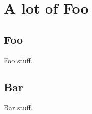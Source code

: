 \documentclass[openany]{memoir}
\begin{document}
\part{A lot of Foo}
\chapter{Foo}

Foo stuff.

\chapter{Bar}

Bar stuff.
\end{document}
